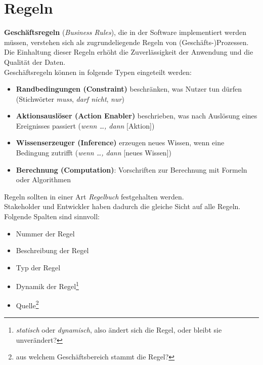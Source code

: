 \section{Regeln}
\textbf{Geschäftsregeln} (\textit{Business Rules}), die in der Software implementiert werden müssen, verstehen sich als zugrundeliegende Regeln von (Geschäfts-)Prozessen.\\
Die Einhaltung dieser Regeln erhöht die Zuverlässigkeit der Anwendung und die Qualität der Daten.\\

\noindent
Geschäftsregeln können in folgende Typen eingeteilt werden:

\begin{itemize}
    \item \textbf{Randbedingungen (Constraint)} beschränken, was Nutzer tun dürfen (Stichwörter \textit{muss}, \textit{darf nicht}, \textit{nur})
    \item \textbf{Aktionsauslöser (Action Enabler)} beschrieben, was nach Auslösung eines Ereignisses passiert (\textit{wenn \ldots, dann} [Aktion])
    \item \textbf{Wissenserzeuger (Inference)} erzeugen neues Wissen, wenn eine Bedingung zutrifft (\textit{wenn \ldots, dann} [neues Wissen])
    \item \textbf{Berechnung (Computation)}: Vorschriften zur Berechnung mit Formeln oder Algorithmen
\end{itemize}

\noindent
Regeln sollten in einer Art \textit{Regelbuch} festgehalten werden.\\
Stakeholder und Entwickler haben dadurch die gleiche Sicht auf alle Regeln.\\
Folgende Spalten sind sinnvoll:

\begin{itemize}
    \item Nummer der Regel
    \item Beschreibung der Regel
    \item Typ der Regel
    \item Dynamik der Regel\footnote{\textit{statisch} oder \textit{dynamisch}, also ändert sich die Regel, oder bleibt sie unverändert?}
    \item Quelle\footnote{aus welchem Geschäftsbereich stammt die Regel?}
\end{itemize}
